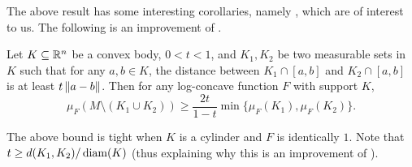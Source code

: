 The above result has some interesting corollaries, namely , which are of interest to us. The following is an improvement of .

\begin{ftheo}
\label{improvement of conductance isoperimetric inequality}
	Let $K\subseteq\mathbb{R}^n$ be a convex body, $0<t<1$, and $K_1,K_2$ be two measurable sets in $K$ such that for any $a,b\in K$, the distance between $K_1\cap[a,b]$ and $K_2\cap[a,b]$ is at least $t\left\lVert a-b\right\rVert$. Then for any log-concave function $F$ with support $K$,
	\[ \mu_F(M\setminus(K_1\cup K_2)) \geq \frac{2t}{1-t} \min\{\mu_F(K_1),\mu_F(K_2)\}. \]
\end{ftheo}

The above bound is tight when $K$ is a cylinder and $F$ is identically $1$. Note that $t \geq d(K_1, K_2)/\operatorname{diam}(K)$ (thus explaining why this is an improvement of ).

